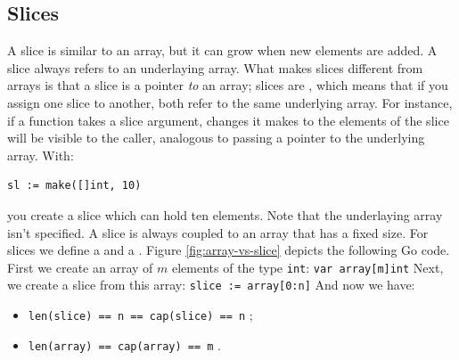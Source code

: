 \subsection{Slices}
\label{sec:slices}
A slice is similar to an array, but it can grow when new elements
are added.
A slice always refers to an underlaying array. What makes slices different
from
arrays is that a slice is a pointer \emph{to} an array;
slices are , 
which means that if you assign one slice to
another, both refer to the same underlying array. For instance, if a
function takes a slice argument, changes it makes to the elements of the
slice will be visible to the caller, analogous to passing a pointer to
the underlying array. With:
\begin{lstlisting}
sl := make([]int, 10)
\end{lstlisting}
you create a slice which can hold ten elements. Note that the
underlaying array isn't specified.
A slice is always coupled to an array that has
a fixed size. For slices we define a  and a
. 
Figure \ref{fig:array-vs-slice} depicts the following Go code.
First we create an array of $m$ elements of the type \lstinline{int}:
\lstinline{var array[m]int}\newline
Next, we create a slice from this array:
\lstinline{slice := array[0:n]}\newline
And now we have:
\begin{itemize}
\item{\lstinline{len(slice) == n == cap(slice) == n}{} ;}
\item{\lstinline{len(array) == cap(array) == m}{} .}
\end{itemize}
